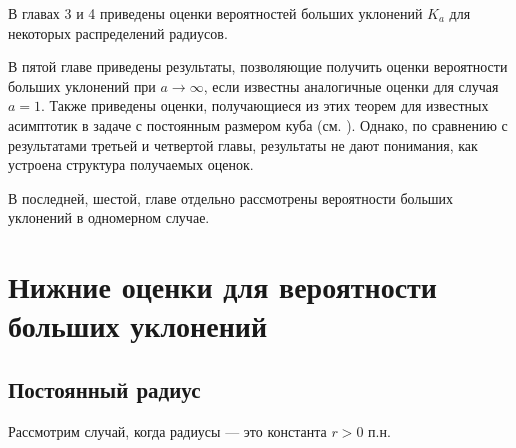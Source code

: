 \documentclass[12pt]{article}
\theoremstyle{plain}
\theoremstyle{definition}
\theoremstyle{remark}
\def\geq{\geqslant}
\newcommand{\cuplim}{\bigcup\limits}
\newcommand{\R}{\mathbb{R}}
\newcommand{\til}{\widetilde}
\begin{document}
В главах 3 и 4 приведены оценки вероятностей больших уклонений $K_a$ для некоторых распределений радиусов. 

В пятой главе приведены результаты, позволяющие получить оценки вероятности больших уклонений при $a\to\infty$, если известны аналогичные оценки для случая $a=1$. Также приведены оценки, получающиеся из этих теорем для известных асимптотик в задаче с постоянным размером куба (см. \cite{AL}). Однако, по сравнению с результатами третьей и четвертой главы, результаты не дают понимания, как устроена структура получаемых оценок.

В последней, шестой, главе отдельно рассмотрены вероятности больших уклонений в одномерном случае.






%
%
%



\section{Нижние оценки для вероятности больших уклонений}

\subsection{Постоянный радиус}

Рассмотрим случай, когда радиусы --- это константа $r>0$ п.н. 
\end{document}
